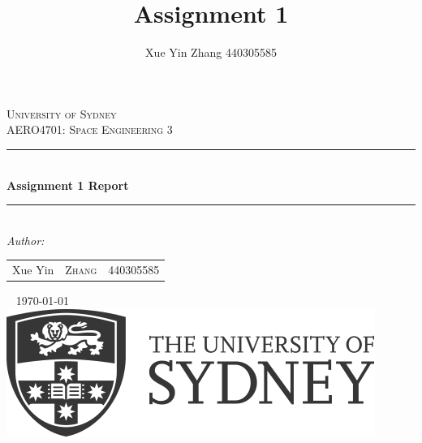 \documentclass{article}
\title{Assignment 1}
\author{Xue Yin Zhang 440305585}
\numberwithin{equation}{subsection}
\numberwithin{figure}{section}
\begin{document}
	

	
\begin{titlepage}
\newcommand{\HRule}{\rule{\linewidth}{0.1mm}} 
\center
\textsc{\LARGE University of Sydney}\\[1.5cm] 
\textsc{\Large AERO4701: Space Engineering 3}\\[0.5cm] 
\HRule \\[0.4cm]
{ \huge \bfseries Assignment 1 Report}\\ 
\HRule \\[1.5cm]

\emph{Author:}\\

\begin{table}[!h]
\centering
\begin{tabular}{rlc}
Xue Yin         & \textsc{Zhang} 		& 440305585 \\
\end{tabular}
\end{table}
~
{\large \today}\\[3cm] 

\includegraphics[scale=0.3]{Logo}\\[1cm] 
\vfill 
\end{titlepage}

\setcounter{page}{1}


\FloatBarrier
\newpage

\FloatBarrier
\newpage
 
\FloatBarrier
\newpage
\begin{appendix}
	
\end{appendix}
\FloatBarrier
\newpage




\pagebreak
\end{document}
